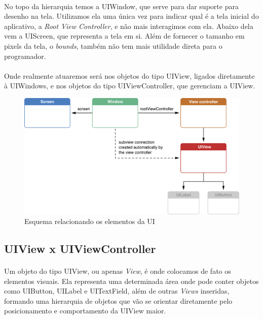 \documentclass[a4paper,12pt,brazil,doubleside]{book}
\begin{document}
\paragraph{}No topo da hierarquia temos a UIWindow, que serve para dar suporte para desenho na tela. Utilizamos ela uma única vez para indicar qual é a tela inicial do aplicativo, a \emph{Root View Controller}, e não mais interagimos com ela. Abaixo dela vem a UIScreen, que representa a tela em si. Além de fornecer o tamanho em pixels da tela, o \emph{bounds}, também não tem mais utilidade direta para o programador.
\paragraph{}Onde realmente atuaremos será nos objetos do tipo UIView, ligados diretamente à UIWindows, e nos objetos do tipo UIViewController, que gerenciam a UIView.

\bigskip
\bigskip

\begin{figure}[h]
  \centering
  \includegraphics[totalheight=0.35\textheight]{../figuras/ios/apple_window_view_controller_screen.png}
  \caption{Esquema relacionando os elementos da UI}
  \label{fig:a}
\end{figure}

\bigskip

\subsection{UIView x UIViewController}

\paragraph{}Um objeto do tipo UIView, ou apenas \emph{View}, é onde colocamos de fato os elementos visuais. Ela representa uma determinada área onde pode conter objetos como UIButton, UILabel e UITextField, além de outras \emph{Views} inseridas, formando uma hierarquia de objetos que vão se orientar diretamente pelo posicionamento e comportamento da UIView maior.
\end{document}
